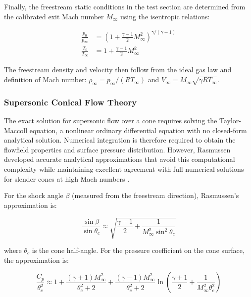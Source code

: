 Finally, the freestream static conditions in the test section are determined from the calibrated exit Mach number $M_\infty$ using the isentropic relations:

\begin{align}
    \frac{p_0}{p_\infty} &= \left(1 + \frac{\gamma - 1}{2}M_\infty^2\right)^{\gamma/(\gamma-1)} \label{eq:freestream-pressure} \\
    \frac{T_0}{T_\infty} &= 1 + \frac{\gamma - 1}{2}M_\infty^2 \label{eq:freestream-temperature}
\end{align}

The freestream density and velocity then follow from the ideal gas law and definition of Mach number: $\rho_\infty = p_\infty/(RT_\infty)$ and $V_\infty = M_\infty\sqrt{\gamma R T_\infty}$.

\subsubsection{Supersonic Conical Flow Theory}

The exact solution for supersonic flow over a cone requires solving the Taylor-Maccoll equation, a nonlinear ordinary differential equation with no closed-form analytical solution. Numerical integration is therefore required to obtain the flowfield properties and surface pressure distribution. However, Rasmussen developed accurate analytical approximations that avoid this computational complexity while maintaining excellent agreement with full numerical solutions for slender cones at high Mach numbers \cite{slaurence2026ludwieg}.

For the shock angle $\beta$ (measured from the freestream direction), Rasmussen's approximation is:

\begin{equation}
    \frac{\sin\beta}{\sin\theta_c} \approx \sqrt{\frac{\gamma + 1}{2} + \frac{1}{M_\infty^2\sin^2\theta_c}}
    \label{eq:rasmussen-shock}
\end{equation}

\noindent where $\theta_c$ is the cone half-angle. For the pressure coefficient on the cone surface, the approximation is:

\begin{equation}
    \frac{C_p}{\theta_c^2} \approx 1 + \frac{(\gamma + 1)M_\infty^2}{\theta_c^2 + 2} + \frac{(\gamma - 1)M_\infty^2}{\theta_c^2 + 2}\ln\left(\frac{\gamma + 1}{2} + \frac{1}{M_\infty^2\theta_c^2}\right)
    \label{eq:rasmussen-cp}
\end{equation}

